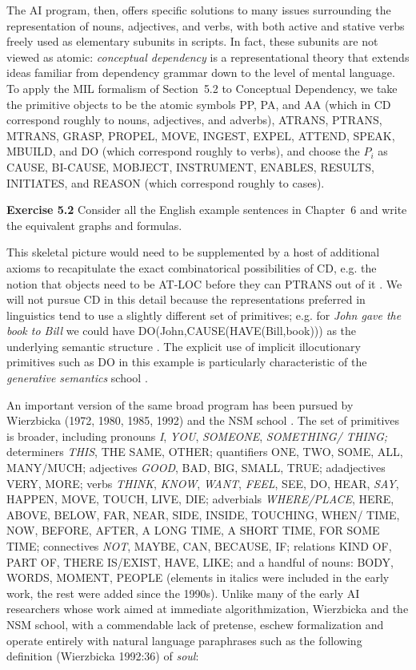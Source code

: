 The AI program, then, offers specific solutions to many issues surrounding the
representation of nouns, adjectives, and verbs, with both active and stative
verbs freely used as elementary subunits in scripts. In fact, these subunits
are not viewed as atomic: {\it conceptual dependency} \cite{Schank:1972} is a
representational theory that extends ideas familiar from dependency grammar
down to the level of mental language. To apply the MIL formalism of
Section~5.2 to Conceptual Dependency, we take the primitive objects to be the
atomic symbols PP, PA, and AA (which in CD correspond roughly to nouns,
adjectives, and adverbs), ATRANS, PTRANS, MTRANS, GRASP, PROPEL, MOVE, INGEST,
EXPEL, ATTEND, SPEAK, MBUILD, and DO (which correspond roughly to verbs), and
choose the $P_i$ as CAUSE, BI-CAUSE, MOBJECT, INSTRUMENT, ENABLES, RESULTS,
INITIATES, and REASON (which correspond roughly to cases).

\smallskip
\noindent
{\bf Exercise 5.2} Consider all the English example sentences in 
Chapter~6 and write the equivalent graphs and formulas.  

\smallskip \noindent This skeletal picture would need to be supplemented by a
host of additional axioms to recapitulate the exact combinatorical
possibilities of CD, e.g. the notion that objects need to be AT-LOC before
they can PTRANS out of it \cite{Schank:1973}. We will not pursue CD in this
detail because the representations preferred in linguistics tend to use a
slightly different set of primitives; e.g. for {\it John gave the book to
  Bill} we could have DO(John,CAUSE(HAVE(Bill,book))) as the underlying
semantic structure \cite{Jackendoff:1972}. The explicit use of implicit
illocutionary primitives such as DO in this example is particularly
characteristic of the {\it generative semantics} school \cite{Harris:1995}.

An important version of the same broad program has been pursued by Wierzbicka
(1972, 1980, 1985, 1992) and the NSM school \cite{Goddard:2002}. The set of
primitives is broader, including pronouns {\it I}, {\it YOU}, {\it SOMEONE},
{\it SOMETHING/ THING;} determiners {\it THIS}, THE SAME, OTHER; quantifiers
ONE, TWO, SOME, ALL, MANY/MUCH; adjectives {\it GOOD}, BAD, BIG, SMALL, TRUE;
adadjectives VERY, MORE; verbs {\it THINK}, {\it KNOW}, {\it WANT}, {\it
  FEEL}, SEE, DO, HEAR, {\it SAY}, HAPPEN, MOVE, TOUCH, LIVE, DIE; adverbials
{\it WHERE/PLACE}, HERE, ABOVE, BELOW, FAR, NEAR, SIDE, INSIDE, TOUCHING,
WHEN/ TIME, NOW, BEFORE, AFTER, A LONG TIME, A SHORT TIME, FOR SOME TIME;
connectives {\it NOT}, MAYBE, CAN, BECAUSE, IF; relations KIND OF, PART OF,
THERE IS/EXIST, HAVE, LIKE; and a handful of nouns: BODY, WORDS, MOMENT,
PEOPLE (elements in italics were included in the early work, the rest were
added since the 1990s). Unlike many of the early AI researchers whose work
aimed at immediate algorithmization, Wierzbicka and the NSM school, with a
commendable lack of pretense, eschew formalization and operate entirely with
natural language paraphrases such as the following definition (Wierzbicka
1992:36) of {\it
  soul}:\nocite{Wierzbicka:1972}\nocite{Wierzbicka:1980}\nocite{Wierzbicka:1985}\nocite{Wierzbicka:1992}

